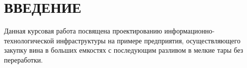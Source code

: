\documentclass[14pt, a4paper]{extarticle}
\begin{document}
\makeatletter
\renewcommand{\l@section}{\@dottedtocline{1}{0em}{1.25em}}
\renewcommand{\l@subsection}{\@dottedtocline{2}{0em}{1.75em}}
\renewcommand{\l@subsubsection}{\@dottedtocline{3}{0em}{2.6em}}
\renewcommand{\@dotsep}{1.25}
\makeatother

\def\contentsname{СОДЕРЖАНИЕ}

\begin{titlepage}


\end{titlepage}
\tableofcontents

\section*{ВВЕДЕНИЕ}
\setcounter{page}{3}

Данная курсовая работа посвящена проектированию информационно-технологической 
инфраструктуры на примере предприятия, осуществляющего закупку вина в больших
емкостях с последующим разливом в мелкие тары без переработки\cite{kurs-metod}.
\end{document}
